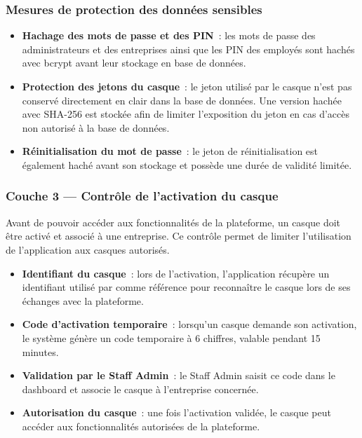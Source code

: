 \subsubsection{Mesures de protection des données sensibles}

\begin{itemize}

  \item \textbf{Hachage des mots de passe et des PIN}~:
  les mots de passe des administrateurs et des entreprises ainsi que les PIN
  des employés sont hachés avec bcrypt avant leur stockage en base de données.

  \item \textbf{Protection des jetons du casque}~:
  le jeton utilisé par le casque n'est pas conservé directement en clair dans
  la base de données. Une version hachée avec SHA-256 est stockée afin de limiter
  l'exposition du jeton en cas d'accès non autorisé à la base de données.

  \item \textbf{Réinitialisation du mot de passe}~:
  le jeton de réinitialisation est également haché avant son stockage et possède
  une durée de validité limitée.

\end{itemize}

\subsubsection{Couche 3 --- Contrôle de l'activation du casque}

Avant de pouvoir accéder aux fonctionnalités de la plateforme, un casque doit être
activé et associé à une entreprise. Ce contrôle permet de limiter l'utilisation de
l'application aux casques autorisés.

\begin{itemize}

  \item \textbf{Identifiant du casque}~:
  lors de l'activation, l'application récupère un identifiant utilisé par
  \tynassit{} comme référence pour reconnaître le casque lors de ses échanges
  avec la plateforme.

  \item \textbf{Code d'activation temporaire}~:
  lorsqu'un casque demande son activation, le système génère un code temporaire
  à 6 chiffres, valable pendant 15 minutes.

  \item \textbf{Validation par le Staff Admin}~:
  le Staff Admin saisit ce code dans le dashboard et associe le casque
  à l'entreprise concernée.

  \item \textbf{Autorisation du casque}~:
  une fois l'activation validée, le casque peut accéder aux fonctionnalités
  autorisées de la plateforme.

\end{itemize}

